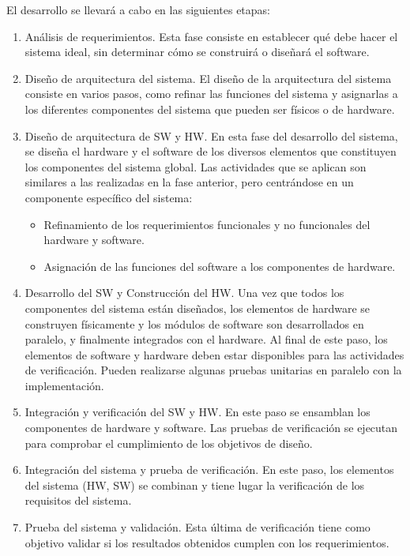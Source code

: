 El desarrollo se llevará a cabo en las siguientes etapas:

\begin{enumerate}
	\item Análisis de requerimientos. Esta fase consiste en establecer qué debe hacer el sistema ideal, sin determinar cómo se construirá o diseñará el software. 
	\item Diseño de arquitectura del sistema. El diseño de la arquitectura del sistema consiste en varios pasos, como refinar las funciones del sistema y asignarlas a los diferentes componentes del sistema que pueden ser físicos o de hardware.
	\item Diseño de arquitectura de SW y HW. En esta fase del desarrollo del sistema, se diseña el hardware y el software de los diversos elementos que constituyen los componentes del sistema global. Las actividades que se aplican son similares a las realizadas en la fase anterior, pero centrándose en un componente específico del sistema: 
		\begin{itemize}
			\item Refinamiento de los requerimientos funcionales y no funcionales del hardware y software.
			\item Asignación de las funciones del software a los componentes de hardware.
		\end{itemize}
	\item Desarrollo del SW y Construcción del HW. Una vez que todos los componentes del sistema están diseñados, los elementos de hardware se construyen físicamente y los módulos de software son desarrollados en paralelo, y finalmente integrados con el hardware. Al final de este paso, los elementos de software y hardware deben estar disponibles para las actividades de verificación. Pueden realizarse algunas pruebas unitarias en paralelo con la implementación.
	\item Integración y verificación del SW y HW. En este paso se ensamblan los componentes de hardware y software. Las pruebas de verificación se ejecutan para comprobar el cumplimiento de los objetivos de diseño.
	\item Integración del sistema y prueba de verificación. En este paso, los elementos del sistema (HW, SW) se combinan y tiene lugar la verificación de los requisitos del sistema. 
	\item Prueba del sistema y validación. Esta última de verificación tiene como objetivo validar si los resultados obtenidos cumplen con los requerimientos.
\end{enumerate}


